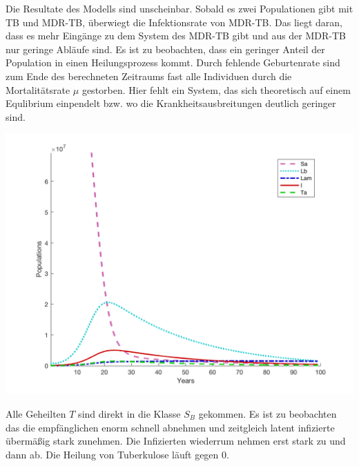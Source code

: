 \documentclass[paper=a4, fontsize=11pt, ngerman, abstract=on]{scrartcl}
\numberwithin{equation}{section} %
\numberwithin{figure}{section} %
\numberwithin{table}{section} %
\begin{document}
Die Resultate des Modells sind unscheinbar. Sobald es zwei Populationen gibt mit TB und MDR-TB, überwiegt die Infektionsrate von MDR-TB.
Das liegt daran, dass es mehr Eingänge zu dem System des MDR-TB gibt und aus der MDR-TB nur geringe Abläufe sind. Es ist zu beobachten, dass ein geringer Anteil der Population in einen Heilungsprozess kommt. Durch fehlende Geburtenrate sind zum Ende des berechneten Zeitraums fast alle Individuen durch die Mortalitätsrate $\mu$ gestorben. Hier fehlt ein System, das sich theoretisch auf einem Equlibrium einpendelt bzw. wo die Krankheitsausbreitungen deutlich geringer sind.

\begin{minipage}{0.6\linewidth}
  \includegraphics[width=\linewidth]{images/mdr_tb_1}
  \label{fig:mdr-tb-1}
\end{minipage}\hfill
\begin{minipage}{0.4\linewidth}
  Alle Geheilten $T$ sind direkt in die Klasse $S_{B}$ gekommen. Es ist zu beobachten das die empfänglichen enorm schnell abnehmen und zeitgleich latent infizierte übermäßig stark zunehmen. Die Infizierten wiederrum nehmen erst stark zu und dann ab. Die Heilung von Tuberkulose läuft gegen 0.
\end{minipage}\\\\
\end{document}
